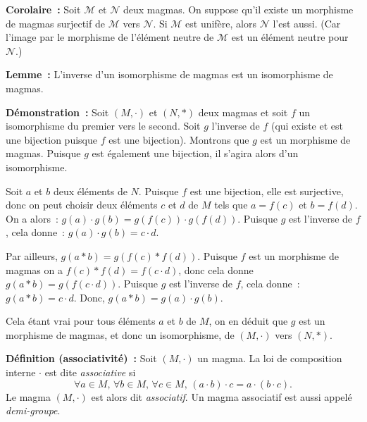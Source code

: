     \hfill \square

\medskip

\noindent\textbf{Corolaire :} Soit $\mathcal{M}$ et $\mathcal{N}$ deux magmas. 
    On suppose qu'il existe un morphisme de magmas surjectif de $\mathcal{M}$ vers $\mathcal{N}$. 
    Si $\mathcal{M}$ est unifère, alors $\mathcal{N}$ l'est aussi. 
    (Car l'image par le morphisme de l'élément neutre de $\mathcal{M}$ est un élément neutre pour $\mathcal{N}$.)

\medskip

\noindent\textbf{Lemme :} L'inverse d'un isomorphisme de magmas est un isomorphisme de magmas.

\medskip

\noindent\textbf{Démonstration :} Soit $\left(M, \cdot \right)$ et $\left(N, \ast \right)$ deux magmas et soit $f$ un isomorphisme du premier vers le second. 
    Soit $g$ l'inverse de $f$ (qui existe et est une bijection puisque $f$ est une bijection). 
    Montrons que $g$ est un morphisme de magmas. 
    Puisque $g$ est également une bijection, il s'agira alors d'un isomorphisme. 

    Soit $a$ et $b$ deux éléments de $N$. 
    Puisque $f$ est une bijection, elle est surjective, donc on peut choisir deux éléments $c$ et $d$ de $M$ tels que $a = f(c)$ et $b = f(d)$. 
    On a alors : $g(a) \cdot g(b) = g(f(c)) \cdot g(f(d))$.
    Puisque $g$ est l'inverse de $f$, cela donne : $g(a) \cdot g(b) = c \cdot d$. 

    Par ailleurs, $g(a \ast b) = g(f(c) \ast f(d))$. 
    Puisque $f$ est un morphisme de magmas on a $f(c) \ast f(d) = f (c \cdot d)$, donc cela donne $g(a \ast b) = g(f(c \cdot d))$.
    Puisque $g$ est l'inverse de $f$, cela donne : $g(a \ast b) = c \cdot d$. 
    Donc, $g(a \ast b) = g(a) \cdot g(b)$. 

    Cela étant vrai pour tous éléments $a$ et $b$ de $M$, on en déduit que $g$ est un morphisme de magmas, et donc un isomorphisme, de $\left(M, \cdot \right)$ vers $\left(N, \ast \right)$.

    \hfill \square

\medskip

\noindent\textbf{Définition (associativité) :} Soit $(M,\cdot)$ un magma.
    La loi de composition interne $\cdot$ est dite \textit{associative} si
    \begin{equation*}
        \forall a \in M, \, \forall b \in M, \, \forall c \in M , \,  
        (a \cdot b) \cdot c = a \cdot (b \cdot c).
    \end{equation*}
    Le magma $(M, \cdot)$ est alors dit \textit{associatif}. 
    Un magma associatif est aussi appelé \textit{demi-groupe}.

